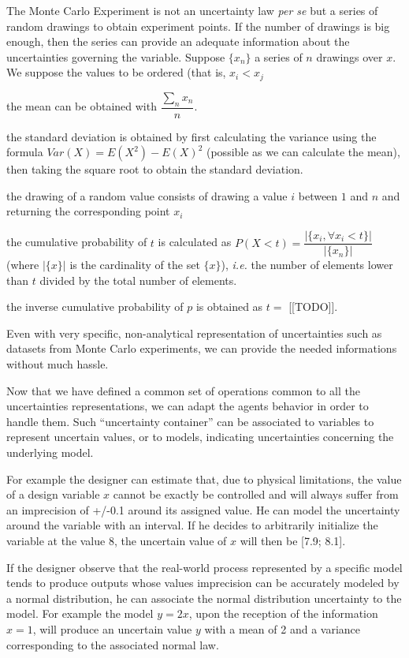 The Monte Carlo Experiment is not an uncertainty law \emph{per se} but a series of random drawings to obtain experiment points. If the number of drawings is big enough, then the series can provide an adequate information about the uncertainties governing the variable. Suppose $\{x_n\}$ a series of $n$ drawings over $x$. We suppose the values to be ordered (that is, $x_i < x_j$ 

\begin{compactitem}
\item the mean can be obtained with $\dfrac{\sum_n{x_n}}{n}$.
\item the standard deviation is obtained by first calculating the variance using the formula $Var(X) = E(X^2) - E(X)^2$ (possible as we can calculate the mean), then taking the square root to obtain the standard deviation.
\item the drawing of a random value consists of drawing a value $i$ between $1$ and $n$ and returning the corresponding point $x_i$
\item the cumulative probability of $t$ is calculated as  $P(X < t) = \dfrac{|\{x_i, \forall x_i < t\}|}{|\{x_n\}|}$ (where $|\{x\}|$ is the cardinality of the set $\{x\}$), \emph{i.e.} the number of elements lower than $t$ divided by the total number of elements.
\item the inverse cumulative probability of $p$ is obtained as $ t = $ [[TODO]].
\end{compactitem}

Even with very specific, non-analytical representation of uncertainties such as datasets from Monte Carlo experiments, we can provide the needed informations without much hassle.

Now that we have defined a common set of operations common to all the uncertainties representations, we can adapt the agents behavior in order to handle them. Such \enquote{uncertainty container} can be associated to variables to represent uncertain values, or to models, indicating uncertainties concerning the underlying model.

For example the designer can estimate that, due to physical limitations, the value of a design variable $x$ cannot be exactly be controlled and will always suffer from an imprecision of +/-0.1 around its assigned value. He can model the uncertainty around the variable with an interval. If he decides to arbitrarily initialize the variable at the value 8, the uncertain value of $x$ will then be [7.9; 8.1].

If the designer observe that the real-world process represented by a specific model tends to produce outputs whose values imprecision can be accurately modeled by a normal distribution, he can associate the normal distribution uncertainty to the model. For example the model $y = 2x$, upon the reception of the information $x = 1$, will produce an uncertain value $y$ with a mean of 2 and a variance corresponding to the associated normal law.

